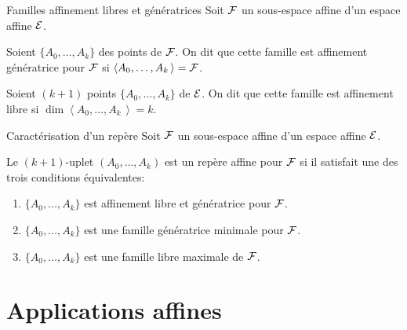 \documentclass[
bigger]{m53beamer}
\begin{document}
  \begin{frame}{Familles affinement libres et génératrices}
    Soit $\mathcal{F}$ un sous-espace affine d'un espace affine $\mathcal{E}$.\pause
    \begin{definition}
      Soient $\{A_{0},\ldots,A_{k}\}$ des points de $\mathcal{F}$. On dit que cette famille est \alert{affinement génératrice} pour $\mathcal{F}$ si $\left<A_{0},\ldots,A_{k}\,\right>=\mathcal{F}$.
    \end{definition}\pause
    \begin{definition}
      Soient $(k+1)$ points $\{A_{0},\ldots,A_{k}\}$ de $\mathcal{E}$. On dit que cette famille est \alert{affinement libre} si $\dim\left<A_{0},\ldots,A_{k}\,\right>=k$.
    \end{definition}
  \end{frame}
  \begin{frame}{Caractérisation d'un repère}
    Soit $\mathcal{F}$ un sous-espace affine d'un espace affine $\mathcal{E}$.
    \begin{proposition}
      Le $(k+1)$-uplet $(A_{0},\ldots,A_{k})$ est un repère affine pour $\mathcal{F}$ si il satisfait une des trois conditions équivalentes:
      \begin{enumerate}[<+(1)->]
        \item $\{A_{0},\ldots,A_{k}\}$ est affinement libre et génératrice pour $\mathcal{F}$.
        \item $\{A_{0},\ldots,A_{k}\}$ est une famille génératrice minimale pour $\mathcal{F}$.
        \item $\{A_{0},\ldots,A_{k}\}$ est une famille libre maximale de $\mathcal{F}$.
      \end{enumerate}
    \end{proposition}
  \end{frame}
\section{Applications affines}
\end{document}
